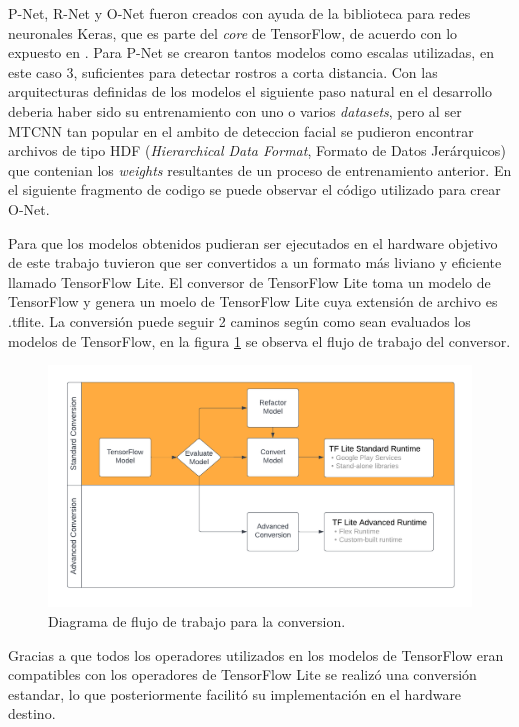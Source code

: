 P-Net, R-Net y O-Net fueron creados con ayuda de la biblioteca para redes neuronales Keras, que es parte del \textit{core} de TensorFlow, de acuerdo con lo expuesto en \cite{mtcnn_info}. Para P-Net se crearon tantos modelos como escalas utilizadas, en este caso 3, suficientes para detectar rostros a corta distancia. Con las arquitecturas definidas de los modelos el siguiente paso natural en el desarrollo deberia haber sido su entrenamiento con uno o varios \textit{datasets}, pero al ser MTCNN tan popular en el ambito de deteccion facial se pudieron encontrar archivos de tipo HDF (\textit{Hierarchical Data Format}, Formato de Datos Jerárquicos) que contenian los \textit{weights} resultantes de un proceso de entrenamiento anterior. En el siguiente fragmento de codigo se puede observar el código utilizado para crear O-Net.

Para que los modelos obtenidos pudieran ser ejecutados en el hardware objetivo de este trabajo tuvieron que ser convertidos a un formato más liviano y eficiente llamado TensorFlow Lite. El conversor de TensorFlow Lite toma un modelo de TensorFlow y genera un moelo de TensorFlow Lite cuya extensión de archivo es .tflite. La conversión puede seguir 2 caminos según como sean evaluados los modelos de TensorFlow, en la figura \ref{fig:tf2tflite_workflow} se observa el flujo de trabajo del conversor.

\begin{figure}[h]
	\centering
	\includegraphics[scale=0.6]{./Figures/tf_convert_workflow_diag.png}
	\caption{Diagrama de flujo de trabajo para la conversion\protect\footnotemark.}
	\label{fig:tf2tflite_workflow}
\end{figure}

Gracias a que todos los operadores utilizados en los modelos de TensorFlow eran compatibles con los operadores de TensorFlow Lite se realizó una conversión estandar, lo que posteriormente facilitó su implementación en el hardware destino.

